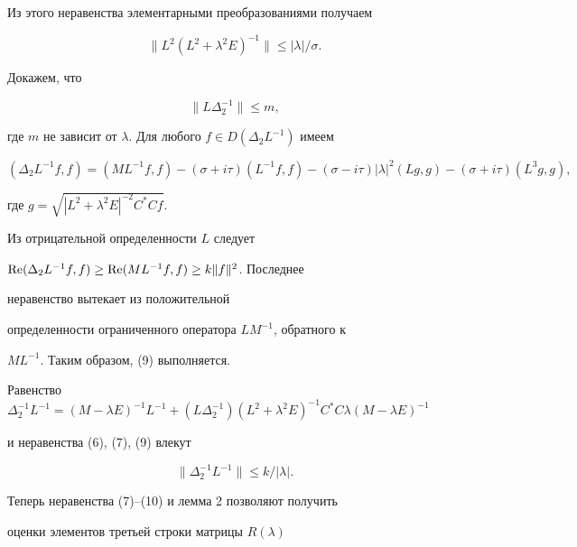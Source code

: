 \begin{pf}
Из этого неравенства элементарными преобразованиями получаем 


\begin{equation} 


\|L^2(L^2+\lambda^2E)^{-1}\|\le|\lambda|/\sigma. 


\end{equation} 


 


Докажем, что 


\begin{equation} 


\|L\Delta^{-1}_2\|\le m, 


\end{equation} 


где $m$ не зависит от $\lambda$. Для любого $f\in D(\Delta_2L^{-1})$ имеем 


$$ 


(\Delta_2L^{-1}f,f)=(ML^{-1}f,f)-(\sigma+i\tau) 


(L^{-1}f,f)-(\sigma-i\tau)|\lambda|^2(Lg,g)- 


(\sigma+i\tau)(L^3g,g), 


$$ 


где $g=\sqrt{|L^2+\lambda^2E|^{-2}C^*Cf}$. 


Из отрицательной определенности $L$ следует 


$\operatorname{Re}(\Delta_2L^{-1}f,f)\ge \operatorname{Re}(ML^{-1}f,f)\ge k\|f\|^2$. Последнее 


неравенство вытекает из положительной 


определенности ограниченного оператора $LM^{-1}$, обратного к 


$ML^{-1}$. Таким образом, (9) выполняется. 


 


Равенство $\Delta^{-1}_2L^{-1}=(M-\lambda E)^{-1}L^{-1}+ 


(L\Delta^{-1}_2)(L^2+\lambda^2E)^{-1} C^*C\lambda(M-\lambda E)^{-1}$ 


и неравенства (6), (7), (9) влекут 


\begin{equation} 


\|\Delta^{-1}_2L^{-1}\|\le k/|\lambda|. 


\end{equation} 


Теперь неравенства (7)--(10) и лемма 2 позволяют получить 


оценки элементов третьей строки матрицы $R(\lambda)$ 



\end{pf}
